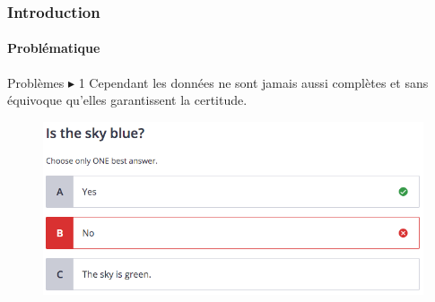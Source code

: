 \documentclass[aspectratio=169,professionalfonts, 12pt]{beamer}
\begin{document}
\begin{frame}
  \frametitle{Introduction}
  \framesubtitle{Problématique}
  \begin{minipage}{0.5\textwidth}
    \begin{alertblock}{Problèmes \(\displaystyle \blacktriangleright \) 1}
      Cependant les données ne sont jamais aussi complètes et sans équivoque qu’elles garantissent la certitude.
    \end{alertblock}
  \end{minipage}
  \begin{minipage}{2cm}
  
  \end{minipage}
  \begin{minipage}{0.4\textwidth}
    \begin{figure}[t]
    \begin{center}
      \includegraphics[width=\textwidth]{images/etat_art/quiz_response1_1.png}
    \end{center}
    \end{figure} 
  \end{minipage}
\end{frame}
\end{document}
